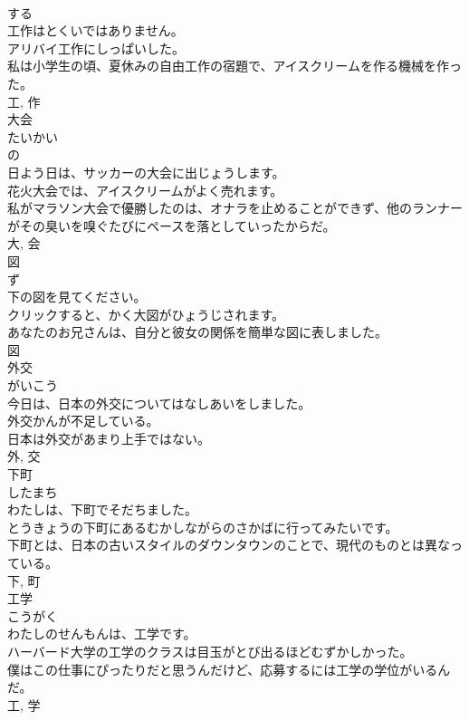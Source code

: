 \documentclass[8pt]{extreport}
\begin{document}
\begin{CJK}{UTF8}{min}
\\	する 
\\	工作はとくいではありません。	
\\	アリバイ工作にしっぱいした。	
\\	私は小学生の頃、夏休みの自由工作の宿題で、アイスクリームを作る機械を作った。	
\\	工, 作	
\\	大会	
\\	たいかい	
\\	の 
\\	日よう日は、サッカーの大会に出じょうします。	
\\	花火大会では、アイスクリームがよく売れます。	
\\	私がマラソン大会で優勝したのは、オナラを止めることができず、他のランナーがその臭いを嗅ぐたびにペースを落としていったからだ。	
\\	大, 会	
\\	図	
\\	ず	
\\	下の図を見てください。	
\\	クリックすると、かく大図がひょうじされます。	
\\	あなたのお兄さんは、自分と彼女の関係を簡単な図に表しました。	
\\	図	
\\	外交	
\\	がいこう	
\\	今日は、日本の外交についてはなしあいをしました。	
\\	外交かんが不足している。	
\\	日本は外交があまり上手ではない。	
\\	外, 交	
\\	下町	
\\	したまち	
\\	わたしは、下町でそだちました。	
\\	とうきょうの下町にあるむかしながらのさかばに行ってみたいです。	
\\	下町とは、日本の古いスタイルのダウンタウンのことで、現代のものとは異なっている。	
\\	下, 町	
\\	工学	
\\	こうがく	
\\	わたしのせんもんは、工学です。	
\\	ハーバード大学の工学のクラスは目玉がとび出るほどむずかしかった。	
\\	僕はこの仕事にぴったりだと思うんだけど、応募するには工学の学位がいるんだ。	
\\	工, 学	

\end{CJK}
\end{document}
